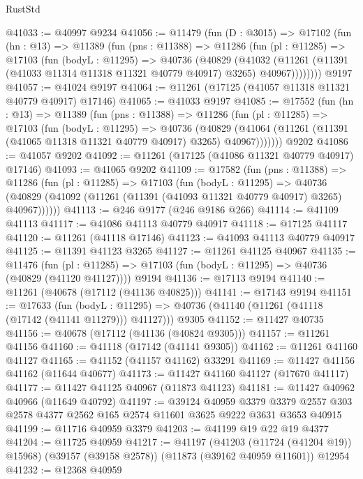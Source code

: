 \begin{lexlean}{RustStd}
\begin{coremodule}
@41033 := @40997 @9234
@41056 := @11479
    (fun (D : @3015) =>
    @17102
      (fun (hn : @13) =>
      @11389
        (fun (pns : @11388) =>
        @11286
          (fun (pl : @11285) =>
          @17103
            (fun (bodyL : @11295) =>
            @40736
              (@40829
                (@41032
                  (@11261 (@11391 (@41033 @11314 @11318 @11321 @40779 @40917) @3265) @40967))))))))
    @9197
@41057 := @41024 @9197
@41064 := @11261 (@17125 (@41057 @11318 @11321 @40779 @40917) @17146)
@41065 := @41033 @9197
@41085 := @17552
    (fun (hn : @13) =>
    @11389
      (fun (pns : @11388) =>
      @11286
        (fun (pl : @11285) =>
        @17103
          (fun (bodyL : @11295) =>
          @40736
            (@40829
              (@41064 (@11261 (@11391 (@41065 @11318 @11321 @40779 @40917) @3265) @40967)))))))
    @9202
@41086 := @41057 @9202
@41092 := @11261 (@17125 (@41086 @11321 @40779 @40917) @17146)
@41093 := @41065 @9202
@41109 := @17582
    (fun (pns : @11388) =>
    @11286
      (fun (pl : @11285) =>
      @17103
        (fun (bodyL : @11295) =>
        @40736 (@40829 (@41092 (@11261 (@11391 (@41093 @11321 @40779 @40917) @3265) @40967))))))
@41113 := @246 @9177 (@246 @9186 @266)
@41114 := @41109 @41113
@41117 := @41086 @41113 @40779 @40917
@41118 := @17125 @41117
@41120 := @11261 (@41118 @17146)
@41123 := @41093 @41113 @40779 @40917
@41125 := @11391 @41123 @3265
@41127 := @11261 @41125 @40967
@41135 := @11476
    (fun (pl : @11285) => @17103 (fun (bodyL : @11295) => @40736 (@40829 (@41120 @41127))))
    @9194
@41136 := @17113 @9194
@41140 := @11261 (@40678 (@17112 (@41136 @40825)))
@41141 := @17143 @9194
@41151 := @17633
    (fun (bodyL : @11295) => @40736 (@41140 (@11261 (@41118 (@17142 (@41141 @11279))) @41127)))
    @9305
@41152 := @11427 @40735
@41156 := @40678 (@17112 (@41136 (@40824 @9305)))
@41157 := @11261 @41156
@41160 := @41118 (@17142 (@41141 @9305))
@41162 := @11261 @41160 @41127
@41165 := @41152 (@41157 @41162) @33291
@41169 := @11427 @41156 @41162 (@11644 @40677)
@41173 := @11427 @41160 @41127 (@17670 @41117)
@41177 := @11427 @41125 @40967 (@11873 @41123)
@41181 := @11427 @40962 @40966 (@11649 @40792)
@41197 := @39124
    @40959
    @3379
    @3379
    @2557
    @303
    @2578
    @4377
    @2562
    @165
    @2574
    @11601
    @3625
    @9222
    @3631
    @3653
    @40915
@41199 := @11716 @40959 @3379
@41203 := @41199 @19 @22 @19 @4377
@41204 := @11725 @40959
@41217 := @41197
    (@41203 (@11724 (@41204 @19)) @15968)
    (@39157 (@39158 @2578))
    (@11873 (@39162 @40959 @11601))
    @12954
@41232 := @12368
    @40959

\end{coremodule}
\end{lexlean}
